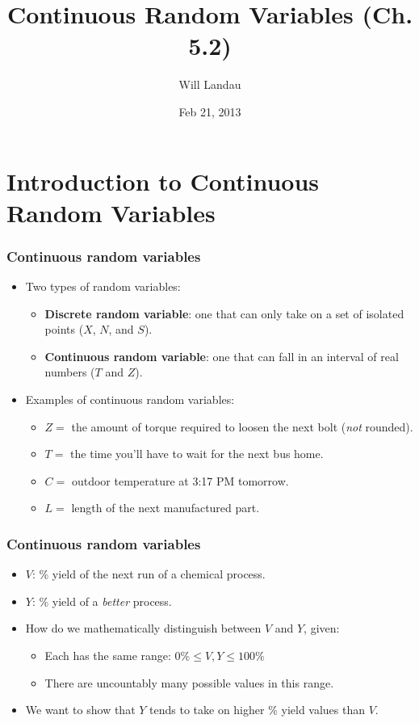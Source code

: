 \documentclass[handout]{beamer}\usepackage{graphicx, color}
\title{Continuous Random Variables (Ch. 5.2)}
\author{Will Landau}
\date{Feb 21, 2013}
\institute{Iowa State University}
\numberwithin{equation}{section}
\begin{document}
\begin{frame}
\titlepage
 \end{frame}
 

\section{Introduction to Continuous Random Variables}

\begin{frame}
\frametitle{Continuous random variables}
\begin{itemize}
\pause \item Two types of random variables:
\begin{itemize}
\pause \item {\bf Discrete random variable}: one that can only take on a set of isolated points ($X$, $N$, and $S$).
\pause \item {\bf Continuous random variable}: one that can fall in an interval of real numbers ($T$ and $Z$). 
\end{itemize}
\pause \item Examples of continuous random variables:
\begin{itemize}
\pause \item $Z = $ the amount of torque required to loosen the next bolt (\emph{not} rounded).
\pause \item $T = $ the time you'll have to wait for the next bus home.
\pause \item $C = $ outdoor temperature at 3:17 PM tomorrow.
\pause \item $L =$ length of the next manufactured part.
\end{itemize}
\end{itemize}
\end{frame}



\begin{frame}
\frametitle{Continuous random variables}

\begin{itemize}
\pause \item $V$: \% yield of the next run of a chemical process.
\pause \item $Y$: \% yield of a \emph{better} process.
\pause \item How do we mathematically distinguish between $V$ and $Y$, given:
\begin{itemize}
\pause \item Each has the same range: $0\% \le V, Y \le 100\%$
\pause \item There are uncountably many possible values in this range.
\end{itemize} 
\pause \item We want to show that $Y$ tends to take on higher \% yield values than $V$.
\end{itemize}
\end{frame}
\end{document}
